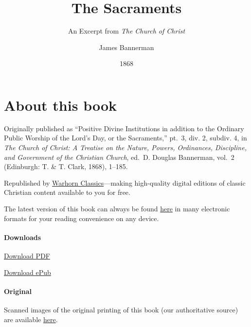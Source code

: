\documentclass[
  english,
]{book}
\title{The Sacraments}
\subtitle{An Excerpt from \emph{The Church of Christ}}
\author{James Bannerman}
\date{1868}
\begin{document}
\maketitle

\mainmatter
{}

{
\setcounter{tocdepth}{1}
\tableofcontents
}
\hypertarget{about-this-book}{%
\chapter*{About this book}\label{about-this-book}}

Originally published as ``Positive Divine Institutions in addition to the Ordinary Public Worship of the Lord's Day, or the Sacraments,'' pt.~3, div. 2, subdiv. 4, in \emph{The Church of Christ: A Treatise on the Nature, Powers, Ordinances, Discipline, and Government of the Christian Church}, ed.~D. Douglas Bannerman, vol.~2 (Edinburgh: T. \& T. Clark, 1868), 1--185.

Republished by \href{https://classics.warhornmedia.com/}{Warhorn Classics}---making high-quality digital editions of classic Christian content available to you for free.

The latest version of this book can always be found \href{https://warhornmedia.github.io/bannerman-sacraments/}{here} in many electronic formats for your reading convenience on any device.

\hypertarget{downloads}{%
\subsubsection*{Downloads}\label{downloads}}

\href{https://warhornmedia.github.io/bannerman-sacraments//Bannerman-Sacraments.pdf}{Download PDF}

\href{https://warhornmedia.github.io/bannerman-sacraments//Bannerman-Sacraments.epub}{Download ePub}

\hypertarget{original}{%
\subsubsection*{Original}\label{original}}

Scanned images of the original printing of this book (our authoritative source) are available \href{https://archive.org/details/churchofchristtr02bann/page/n11/mode/2up}{here}.
\end{document}
